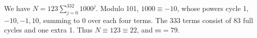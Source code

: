 We have $N=123\sum_{j=0}^{332}1000^j$. Modulo 101, $1000\equiv-10$, whose powers cycle 1,$-10,-1,10$, summing to 0 over each four terms. The 333 terms consist of 83 full cycles and one extra 1. Thus $N\equiv123\equiv22$, and $\boxed{m=79}$.
